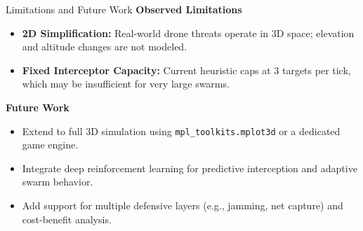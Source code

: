 \documentclass{beamer}
\begin{document}
\begin{frame}{Limitations and Future Work}
    \textbf{Observed Limitations}
    \begin{itemize}
        \item \textbf{2D Simplification:} Real-world drone threats operate in 3D space; elevation and altitude changes are not modeled.
        \item \textbf{Fixed Interceptor Capacity:} Current heuristic caps at 3 targets per tick, which may be insufficient for very large swarms.
    \end{itemize}
    \vspace{0.3cm}
    \textbf{Future Work}
    \begin{itemize}
        \item Extend to full 3D simulation using \texttt{mpl\_toolkits.mplot3d} or a dedicated game engine.
        \item Integrate deep reinforcement learning for predictive interception and adaptive swarm behavior.
        \item Add support for multiple defensive layers (e.g., jamming, net capture) and cost-benefit analysis.
    \end{itemize}
\end{frame}
\end{document}
